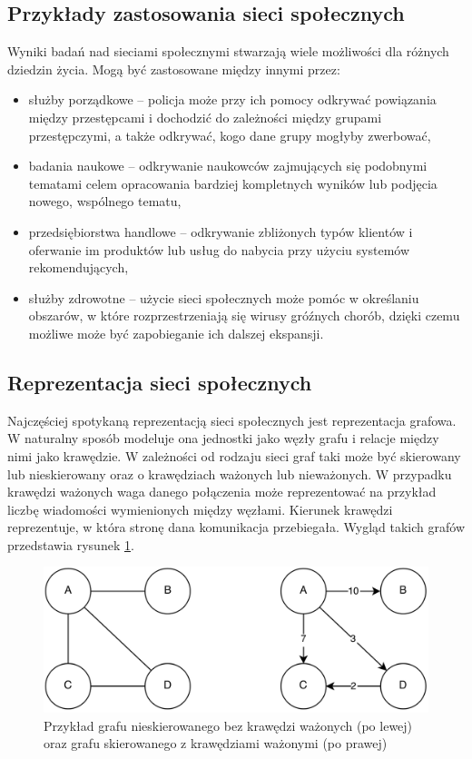 \subsection{Przykłady zastosowania sieci społecznych}
Wyniki badań nad sieciami społecznymi stwarzają wiele możliwości dla różnych
dziedzin życia. Mogą być zastosowane między innymi przez:
\begin{itemize}
  \item służby porządkowe -- policja może przy ich pomocy odkrywać powiązania
  między przestępcami i dochodzić do zależności między grupami przestępczymi,
  a także odkrywać, kogo dane grupy mogłyby zwerbować, 
  \item badania naukowe -- odkrywanie naukowców zajmujących się podobnymi tematami
  celem opracowania bardziej kompletnych wyników lub podjęcia nowego,
  wspólnego tematu,
  \item przedsiębiorstwa handlowe -- odkrywanie zbliżonych typów klientów i 
  oferwanie im produktów lub usług do nabycia przy użyciu systemów rekomendujących,
  \item służby zdrowotne -- użycie sieci społecznych może pomóc w określaniu
  obszarów, w które rozprzestrzeniają się wirusy gróźnych chorób, dzięki czemu
  możliwe może być zapobieganie ich dalszej ekspansji.
\end{itemize}



\subsection{Reprezentacja sieci społecznych}
Najczęściej spotykaną reprezentacją sieci społecznych jest reprezentacja grafowa.
W naturalny sposób modeluje ona jednostki jako węzły grafu i relacje między nimi
jako krawędzie. W zależności od rodzaju sieci graf taki może być skierowany lub 
nieskierowany oraz o krawędziach ważonych lub nieważonych. W przypadku
krawędzi ważonych waga danego połączenia może reprezentować na przykład
liczbę wiadomości wymienionych między węzłami. Kierunek krawędzi reprezentuje,
w która stronę dana komunikacja przebiegała. Wygląd takich grafów przedstawia rysunek 
\ref{image:graf-reprezentacja}.

\clearpage
\begin{figure}[ht!]
\centering
\includegraphics[width=120mm]{img/graf-reprezentacja.png}
\caption{Przykład grafu nieskierowanego bez krawędzi ważonych (po lewej)
oraz grafu skierowanego z krawędziami ważonymi (po prawej)}
\label{image:graf-reprezentacja}
\end{figure}




